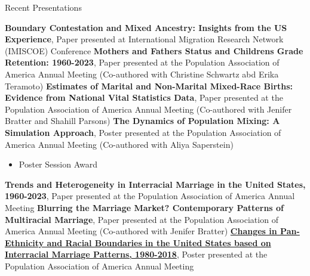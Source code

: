 \begin{rubric}{Recent Presentations}






\entry*[2026] \textbf{Boundary Contestation and Mixed Ancestry: Insights from the US Experience}, Paper presented at International Migration Research Network (IMISCOE) Conference  
\entry*[2026] \textbf{Mothers\textquotesingle{} and Fathers\textquotesingle{} Status and Children\textquotesingle{}s Grade Retention: 1960-2023}, Paper presented at the Population Association of America Annual Meeting (Co-authored with Christine Schwartz abd Erika Teramoto) 
\entry*[2026] \textbf{Estimates of Marital and Non-Marital Mixed-Race Births: Evidence from National Vital Statistics Data}, Paper presented at the Population Association of America Annual Meeting (Co-authored with Jenifer Bratter and Shahill Parsons) 
\entry*[2026] \textbf{The Dynamics of Population Mixing: A Simulation Approach}, Poster presented at the Population Association of America Annual Meeting (Co-authored with Aliya Saperstein) \begin{itemize}
\item Poster Session Award

\end{itemize}
\entry*[2026] \textbf{Trends and Heterogeneity in Interracial Marriage in the United States, 1960-2023}, Paper presented at the Population Association of America Annual Meeting  
\entry*[2025] \textbf{Blurring the Marriage Market? Contemporary Patterns of Multiracial Marriage}, Paper presented at the Population Association of America Annual Meeting (Co-authored with Jenifer Bratter) 
\entry*[2021] \textbf{\href{https://aarongullickson.netlify.app/talk/panethnic_mar/poster.pdf}{Changes in Pan-Ethnicity and Racial Boundaries in the United States based on Interracial Marriage Patterns, 1980-2018}}, Poster presented at the Population Association of America Annual Meeting  

\end{rubric}
